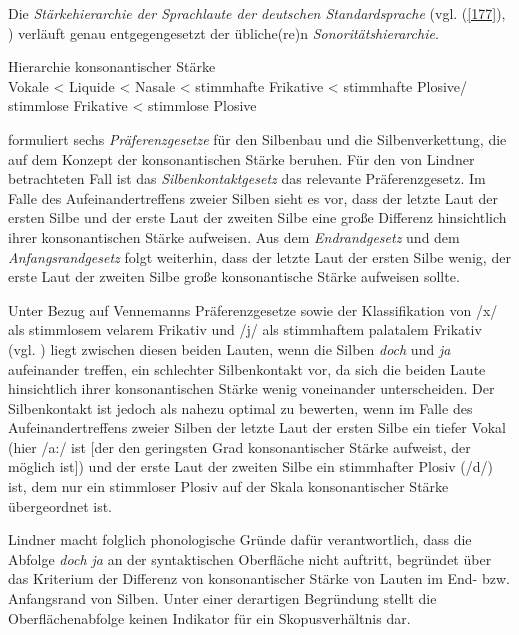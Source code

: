 Die \textit{Stärkehierarchie der Sprachlaute der deutschen Standardsprache} (vgl. (\ref{177}), \citealt[284]{Vennemann1982}) verläuft genau entgegengesetzt der übliche(re)n  \textit{Sonori\-tätshierarchie}.

\begin{exe}
	\ex\label{177} 
	Hierarchie konsonantischer Stärke \\
	Vokale < Liquide < Nasale < stimmhafte Frikative < stimmhafte Plosive/ \\ stimmlose Frikative < stimmlose Plosive
\end{exe}
\citet[283]{Vennemann1982} formuliert sechs \textit{Präferenzgesetze}  für den Silbenbau und die Silbenverkettung, die auf dem Konzept der konsonantischen Stärke beruhen. Für den von Lindner betrachteten Fall ist das \textit{Silbenkontaktgesetz}  das relevante Präferenzgesetz. Im Falle des Aufeinandertreffens zweier Silben sieht es vor, dass der letzte Laut der ersten Silbe und der erste Laut der zweiten Silbe eine große Differenz hinsichtlich ihrer konsonantischen Stärke aufweisen. Aus dem \textit{Endrandgesetz}  und dem \textit{Anfangsrandgesetz}  folgt weiterhin, dass der letzte Laut der ersten Silbe wenig, der erste Laut der zweiten Silbe große konsonantische Stärke aufweisen sollte. 

Unter Bezug auf Vennemanns Präferenzgesetze sowie der Klassifikation von /x/ als stimmlosem velarem Frikativ und /j/ als stimmhaftem palatalem Frikativ (vgl. \citealt[284]{Vennemann1982}) liegt zwischen diesen beiden Lauten, wenn die Silben \textit{doch} und \textit{ja} aufeinander treffen, ein schlechter Silbenkontakt vor, da sich die beiden Laute hinsichtlich ihrer konsonantischen Stärke wenig voneinander unterscheiden. Der Silbenkontakt ist jedoch als nahezu optimal zu bewerten, wenn im Falle des Aufeinandertreffens zweier Silben der letzte Laut der ersten Silbe ein tiefer Vokal (hier /a:/ ist $[$der den geringsten Grad konsonantischer Stärke aufweist, der möglich ist$]$) und der erste Laut der zweiten Silbe ein stimmhafter Plosiv (/d/) ist, dem nur ein stimmloser Plosiv auf der Skala konsonantischer Stärke übergeordnet ist. 

Lindner macht folglich phonologische Gründe dafür verantwortlich, dass die Abfolge \textit{doch ja} an der syntaktischen Oberfläche nicht auftritt, begründet über das Kriterium der Differenz von konsonantischer Stärke von Lauten im End- bzw. Anfangsrand von Silben. Unter einer derartigen Begründung stellt die Oberflächenabfolge keinen Indikator für ein Skopusverhältnis  dar. 

